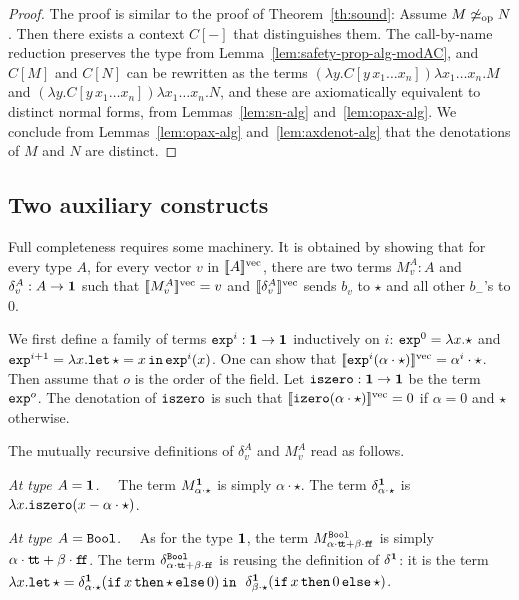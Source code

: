 \documentclass[10pt]{article}
\theoremstyle{plain}
\theoremstyle{definition}
\newcommand{\punit}{{\star}}
\newcommand{\tunit}{{\bf 1}}
\newcommand{\ttrue}{{\tt t}\!{\tt t}}
\newcommand{\ffalse}{{\tt f}\!{\tt f}}
\newcommand{\ifterm}[3]{{{\tt if}\,{#1}\,{\tt then}\,{#2}\,{\tt else}\,{#3}}}
\newcommand{\letunit}[2]{{\tt let}\,\star={#1}\,{\tt in}\,{#2}}
\newcommand{\bit}{{\tt Bool}}
\newcommand{\opeq}{\mathrel{\simeq_{\rm op}}}
\newcommand{\fvdenot}[1]{{[\![{#1}]\!]^{\rm vec}}}
\begin{document}
\begin{proof}
  The proof is similar to the proof of Theorem~\ref{th:sound}: Assume
  $M\not\opeq N$. Then there exists a context $C[-]$ that distinguishes
  them. The call-by-name reduction preserves the type from
  Lemma~\ref{lem:safety-prop-alg-modAC}, and $C[M]$ and $C[N]$ can be rewritten
  as the terms
  $(\lambda y.C[y\,x_1\ldots x_n])\lambda x_1\ldots x_n.M$ and $(\lambda
  y.C[y\,x_1\ldots x_n])\lambda x_1\ldots x_n.N$, and these are axiomatically
  equivalent to distinct normal forms, from Lemmas~\ref{lem:sn-alg}
  and~\ref{lem:opax-alg}. We conclude from Lemmas~\ref{lem:opax-alg}
  and~\ref{lem:axdenot-alg} that the
  denotations of $M$ and $N$ are distinct.
\end{proof}

\subsection{Two auxiliary constructs}
\label{sec:aux-constructs}

Full completeness requires some machinery.  It is obtained by
showing that for every type $A$, for every vector $v$ in
$\fvdenot{A}$, there are two terms $M^A_v : A$ and $\delta^A_v : A \to
\tunit$ such that $\fvdenot{M^A_v} = v$ and $\fvdenot{\delta^A_v}$ sends
$b_{v}$ to $\punit$ and all other $b_{-}$'s to $0$.


We first define a family of terms ${\tt exp}^i:\tunit\to\tunit$
inductively on $i$: ${\tt exp}^0 = \lambda x.\star$ and 
${\tt exp}^{i+1} = \lambda x.\letunit{x}{{\tt exp}^i(x)}$.
One can show that $\fvdenot{{\tt
  exp}^{i}(\alpha\cdot\star)} = \alpha^i\cdot\star$.
Then assume that $o$ is the
order of the field. Let  ${\tt iszero}:\tunit\to\tunit$ be the term 
${\tt exp}^o$. The denotation of ${\tt
  iszero}$ is such that $\fvdenot{{\tt izero}(\alpha\cdot\star)}=0$ if
$\alpha=0$ and $\star$ otherwise.


The mutually recursive definitions of $\delta^A_v$ and $M^A_v$ read as
follows.

\smallskip
\noindent
{\em At type $A=\tunit$.}~~
The term $M^{\tunit}_{\alpha\cdot\star}$ is simply $\alpha\cdot\star$.
The term $\delta^{\tunit}_{\alpha\cdot\star}$ is 
$
\lambda x.{\tt iszero}(x-\alpha\cdot\star)
$.

\smallskip
\noindent
{\em At type $A=\bit$.}~~
As for the type $\tunit$, the term $M^{\bit}_{\alpha\cdot\ttrue+\beta\cdot\ffalse}$
is simply $\alpha\cdot\ttrue+\beta\cdot\ffalse$. The term
$\delta^{\bit}_{\alpha\cdot\ttrue+\beta\cdot\ffalse}$ is reusing the
definition of $\delta^\tunit$: it is the term
$
\lambda
x.\letunit{\delta^{\tunit}_{\alpha\cdot\star}(\ifterm{x}{\star}{0})}{}$
$
\delta^{\tunit}_{\beta\cdot\star}(\ifterm{x}{0}{\star})
$.
\end{document}
